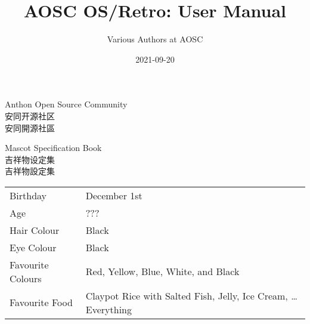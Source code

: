 \documentclass[a5paper,twosided,12pt]{book}
\title{AOSC OS/Retro: User Manual}
\author{Various Authors at AOSC}
\date{2021-09-20}
\begin{document}
    \raggedright
    \raggedbottom








\begin{titlepage}
    \sffamily
    \normalsize
    \bfseries


    Anthon Open Source Community
    \vspace{4pt}\\
    安同开源社区
    \vspace{4pt}\\
    安同開源社區

    \vfill


    \Large
    \mdseries

    Mascot Specification Book
    \vspace{4pt}\\
    吉祥物设定集
    \vspace{4pt}\\
    吉祥物設定集


\end{titlepage}








\newcommand{\tbmdkey}[1]{{
    \sffamily
    \normalsize
    {#1}\hspace{8pt}}}
\newcommand{\tbmdval}[1]{{
    \color{black}
    {#1}}}


\begingroup
    \tabcolsep=0pt
    \color{black}
    \sffamily
    \pagestyle{empty}

    \begin{tabu} {XX[2]}
        \tbmdkey{Birthday} & {December 1st}\\
        \tbmdkey{Age} & {???}\\
        \tbmdkey{Hair Colour} & {Black}\\
        \tbmdkey{Eye Colour} & {Black}\\
        \tbmdkey{Favourite Colours} & {Red, Yellow, Blue, White, and Black}\\
        \tbmdkey{Favourite Food} & {Claypot Rice with Salted Fish, Jelly, Ice Cream, \ldots{} Everything}\\
    \end{tabu}
    
\end{document}
